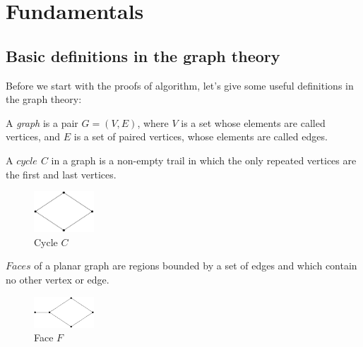 \section{Fundamentals}
\subsection{Basic definitions in the graph theory}
Before we start with the proofs of algorithm, let's give some useful definitions in the graph theory:
\begin{definition}
A \textit{graph} is a pair $G = (V, E)$, where $V$ is a set whose elements are called vertices, and $E$ is a set of paired vertices, whose elements are called edges. \cite{graph}
\end{definition}

\begin{definition}
A \textit{$cycle$ $C$} in a graph is a non-empty trail in which the only repeated vertices are the first and last vertices. \cite{Cycle}
\begin{figure}[H] %
\centering %
\includegraphics[width=0.2\textwidth]{figure/cycle.png} 
\caption{Cycle $C$} %
\label{figure} %
\end{figure}
\end{definition}

\begin{definition}
\textit{$Faces$} of a planar graph are regions bounded by a set of edges and which contain no other vertex or edge. \cite{Face}
\begin{figure}[H] %
\centering %
\includegraphics[width=0.2\textwidth]{figure/face.png} 
\caption{Face $F$} %
\label{figure} %
\end{figure}
\end{definition}


